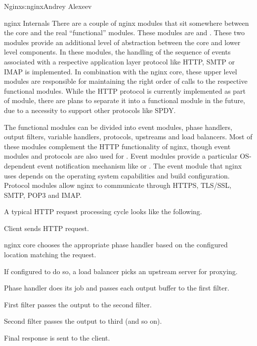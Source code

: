 \begin{aosachapter}{Nginx}{s:nginx}{Andrey Alexeev}
\begin{aosasect1}{nginx Internals}
There are a couple of nginx modules that sit somewhere between the
core and the real ``functional'' modules. These modules are
 and . These two modules provide an additional
level of abstraction between the core and lower level components. In
these modules, the handling of the sequence of events associated with
a respective application layer protocol like HTTP, SMTP or IMAP is
implemented. In combination with the nginx core, these upper level
modules are responsible for maintaining the right order of calls to
the respective functional modules. While the HTTP protocol is
currently implemented as part of  module, there are plans
to separate it into a functional module in the future, due to a
necessity to support other protocols like SPDY.

The functional modules can be divided into event modules, phase
handlers, output filters, variable handlers, protocols, upstreams and
load balancers. Most of these modules complement the HTTP
functionality of nginx, though event modules and protocols are also
used for . Event modules provide a particular OS-dependent
event notification mechanism like  or .  The
event module that nginx uses depends on the operating system
capabilities and build configuration. Protocol modules allow nginx to
communicate through HTTPS, TLS/SSL, SMTP, POP3 and IMAP.

A typical HTTP request processing cycle looks like the following.

\begin{aosaenumerate}

\item Client sends HTTP request.

\item nginx core chooses the appropriate phase handler based on the
  configured location matching the request.

\item If configured to do so, a load balancer picks an upstream server
  for proxying.

\item Phase handler does its job and passes each output buffer to the first
  filter.

\item First filter passes the output to the second filter.

\item Second filter passes the output to third (and so on).

\item Final response is sent to the client.


\end{aosaenumerate}
\end{aosasect1}
\end{aosachapter}
